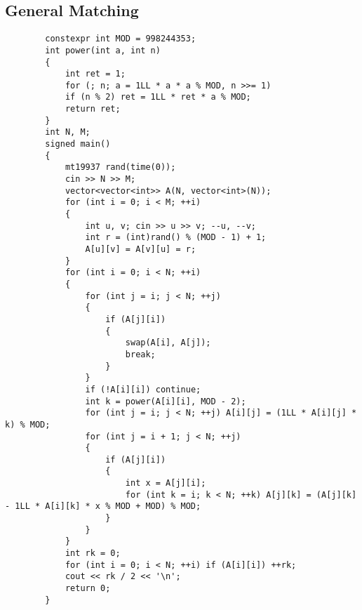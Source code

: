 \documentclass[landscape, 8pt, a4paper, oneside, twocolumn]{extarticle}
\begin{document}
	\subsection {General Matching}
	\begin{verbatim}
		constexpr int MOD = 998244353;
		int power(int a, int n)
		{
			int ret = 1;
			for (; n; a = 1LL * a * a % MOD, n >>= 1)
			if (n % 2) ret = 1LL * ret * a % MOD;
			return ret;
		}
		int N, M;
		signed main()
		{
			mt19937 rand(time(0));
			cin >> N >> M;
			vector<vector<int>> A(N, vector<int>(N));
			for (int i = 0; i < M; ++i)
			{
				int u, v; cin >> u >> v; --u, --v;
				int r = (int)rand() % (MOD - 1) + 1;
				A[u][v] = A[v][u] = r;
			}
			for (int i = 0; i < N; ++i)
			{
				for (int j = i; j < N; ++j)
				{
					if (A[j][i])
					{
						swap(A[i], A[j]);
						break;
					}
				}
				if (!A[i][i]) continue;
				int k = power(A[i][i], MOD - 2);
				for (int j = i; j < N; ++j) A[i][j] = (1LL * A[i][j] * k) % MOD;
				for (int j = i + 1; j < N; ++j)
				{
					if (A[j][i])
					{
						int x = A[j][i];
						for (int k = i; k < N; ++k) A[j][k] = (A[j][k] - 1LL * A[i][k] * x % MOD + MOD) % MOD;
					}
				}
			}
			int rk = 0;
			for (int i = 0; i < N; ++i) if (A[i][i]) ++rk;
			cout << rk / 2 << '\n';
			return 0;
		}
	\end{verbatim}
\end{document}
